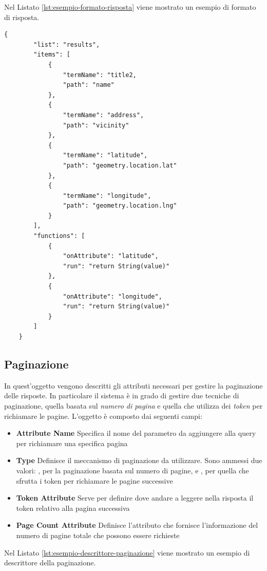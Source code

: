 Nel Listato \ref{lst:esempio-formato-risposta} viene mostrato un esempio di formato di risposta.

\begin{lstlisting}[style=blocco-esempi,
								caption=Esempio di formato di risposta,
								label=lst:esempio-formato-risposta]
	{
		"list": "results",
		"items": [
			{
				"termName": "title2,
				"path": "name"
			},
			{
				"termName": "address",
				"path": "vicinity"
			},
			{
				"termName": "latitude",
				"path": "geometry.location.lat"
			},
			{
				"termName": "longitude",
				"path": "geometry.location.lng"
			}
		],
		"functions": [
			{
				"onAttribute": "latitude",
				"run": "return String(value)"
			},
			{
				"onAttribute": "longitude",
				"run": "return String(value)"
			}
		]
	}
\end{lstlisting}

\subsection{Paginazione\label{sec:descrittore-paginazione}}

In quest'oggetto vengono descritti gli attributi necessari per gestire la paginazione delle risposte. In particolare il sistema è in grado di gestire due tecniche di paginazione, quella basata sul \emph{numero di pagina} e quella che utilizza dei \emph{token} per richiamare le pagine. L'oggetto è composto dai seguenti campi:

\begin{itemize}
	\item \textbf{Attribute Name} Specifica il nome del parametro da aggiungere alla query per richiamare una specifica pagina
	\item \textbf{Type} Definisce il meccanismo di paginazione da utilizzare. Sono ammessi due valori: , per la paginazione basata sul numero di pagine, e , per quella che sfrutta i token per richiamare le pagine successive
	\item \textbf{Token Attribute} Serve per definire dove andare a leggere nella risposta il token relativo alla pagina successiva
	\item \textbf{Page Count Attribute} Definisce l'attributo che fornisce l'informazione del numero di pagine totale che possono essere richieste
\end{itemize}

Nel Listato \ref{lst:esempio-descrittore-paginazione} viene mostrato un esempio di descrittore della paginazione.

